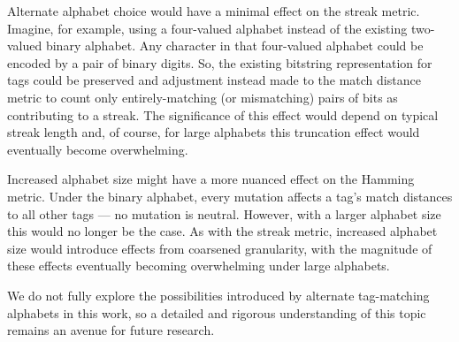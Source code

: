 Alternate alphabet choice would have a minimal effect on the streak metric.
Imagine, for example, using a four-valued alphabet instead of the existing two-valued binary alphabet.
Any character in that four-valued alphabet could be encoded by a pair of binary digits.
So, the existing bitstring representation for tags could be preserved and adjustment instead made to the match distance metric to count only entirely-matching (or mismatching) pairs of bits as contributing to a streak.
The significance of this effect would depend on typical streak length and, of course, for large alphabets this truncation effect would eventually become overwhelming.

Increased alphabet size might have a more nuanced effect on the Hamming metric.
Under the binary alphabet, every mutation affects a tag's match distances to all other tags --- no mutation is neutral.
However, with a larger alphabet size this would no longer be the case.
As with the streak metric, increased alphabet size would introduce effects from coarsened granularity, with the magnitude of these effects eventually becoming overwhelming under large alphabets.

We do not fully explore the possibilities introduced by alternate tag-matching alphabets in this work, so a detailed and rigorous understanding of this topic remains an avenue for future research.
